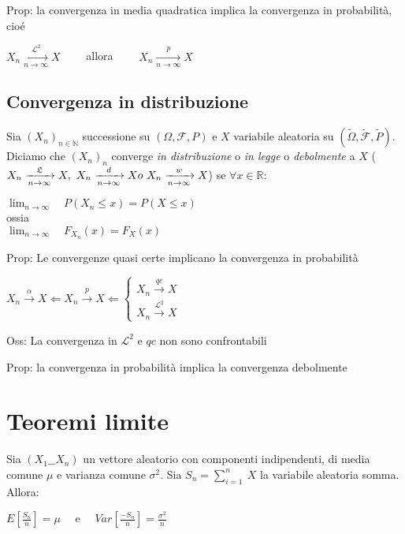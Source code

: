 \documentclass[11pt, letterpaper]{article}
\begin{document}
Prop: la convergenza in media quadratica implica la convergenza in probabilità, cioé
\begin{center}
    $X_{n}\xrightarrow[n\to\infty]{\mathcal{L}^{2}}X\qquad$ allora $\qquad X_{n}\xrightarrow[n\to\infty]{p}X$
\end{center}

\subsection{Convergenza in distribuzione}
Sia $(X_{n})_{n\in\mathbb{N}}$ successione su $(\Omega,\mathcal{F},P)$ e $X$ variabile aleatoria su $(\tilde{\Omega}
,\tilde{\mathcal{F}},\tilde{P})$. Diciamo che $(X_{n})_{n}$ converge \textit{in distribuzione} o \textit{in legge}
o \textit{debolmente} a $X$ ($X_{n}\xrightarrow[n\to\infty]{\mathfrak{L}}X,\ 
X_{n}\xrightarrow[n\to\infty]{d}X\\o\ X_{n}\xrightarrow[n\to\infty]{w}X$) se $\forall x\in\mathbb{R}$:
\begin{center}
    $\lim_{n\to\infty}\quad P(X_{n}\leq x)=P(X\leq x)$\\
    ossia\\
    $\lim_{n\to\infty}\quad F_{X_{n}}(x)=F_{X}(x)$
\end{center}

Prop: Le convergenze quasi certe implicano la convergenza in probabilità
\begin{center}
    $X_{n}\xrightarrow{\alpha}X\Leftarrow X_{n}\xrightarrow{p}X\Leftarrow
    \begin{cases}
        X_{n}\xrightarrow{qc}X\\
        X_{n}\xrightarrow{\mathcal{L}^{2}}X    
    \end{cases}$
\end{center}

Oss: La convergenza in $\mathcal{L}^{2}$ e $qc$ non sono confrontabili

Prop: la convergenza in probabilità implica la convergenza debolmente

\section{Teoremi limite}
Sia $(X_{1}\_\_ X_{n})$ un vettore aleatorio con componenti indipendenti, di media comune $\mu$ e varianza comune
$\sigma^{2}$. Sia $S_{n}=\sum_{i=1}^{n}\ X$ la variabile aleatoria somma. Allora:
\begin{center}
    $E[\frac{S_{n}}{n}]=\mu\quad$ e $\quad Var[\frac{-S_{n}}{n}]=\frac{\sigma^{2}}{n}$
\end{center}
\end{document}
